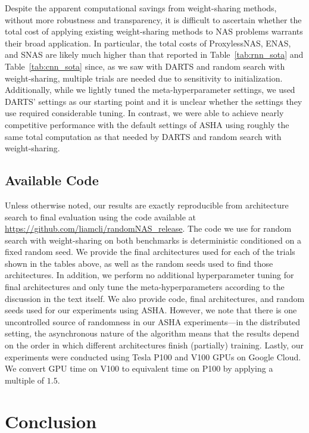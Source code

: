 \documentclass[acmlarge, nonacm]{acmart}
\begin{document}
Despite the apparent computational savings from weight-sharing methods, without more robustness and transparency, it is difficult to ascertain whether the total cost of applying existing weight-sharing methods to NAS problems warrants their broad application.  In particular, the total costs of ProxylessNAS, ENAS, and SNAS are likely much higher than that reported in Table~\ref{tab:rnn_sota} and Table~\ref{tab:cnn_sota} since, as we saw with DARTS and random search with weight-sharing, multiple trials are needed due to sensitivity to initialization. Additionally, while we lightly tuned the meta-hyperparameter settings, we used DARTS' settings as our starting point and it is unclear whether the settings they use required considerable tuning.  In contrast, we were able to achieve nearly competitive performance with the default settings of ASHA using roughly the same total computation as that needed by DARTS and random search with weight-sharing.

\subsection{Available Code}
Unless otherwise noted, our results are exactly reproducible from architecture search to final evaluation using the code available at \url{https://github.com/liamcli/randomNAS_release}.  The code we use for random search with weight-sharing on both benchmarks is deterministic conditioned on a fixed random seed.  We provide the final architectures used for each of the trials shown in the tables above, as well as the random seeds used to find those architectures.  In addition, we perform no additional hyperparameter tuning for final architectures and only tune the meta-hyperparameters according to the discussion in the text itself. We also provide code, final architectures, and random seeds used for our experiments using ASHA.  However, we note that there is one uncontrolled source of randomness in our ASHA experiments---in the distributed setting, the asynchronous nature of the algorithm means that the results depend on the order in which different architectures finish (partially) training. Lastly, our experiments were conducted using Tesla P100 and V100 GPUs on Google Cloud.  We convert GPU time on V100 to equivalent time on P100 by applying a multiple of $1.5$.


\section{Conclusion}
\end{document}
